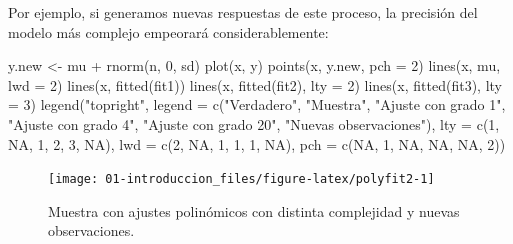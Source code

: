 \documentclass[
]{book}
\newenvironment{Shaded}{\begin{snugshade}}{\end{snugshade}}
\newcommand{\AttributeTok}[1]{\textcolor[rgb]{0.77,0.63,0.00}{#1}}
\newcommand{\ConstantTok}[1]{\textcolor[rgb]{0.00,0.00,0.00}{#1}}
\newcommand{\DecValTok}[1]{\textcolor[rgb]{0.00,0.00,0.81}{#1}}
\newcommand{\FunctionTok}[1]{\textcolor[rgb]{0.00,0.00,0.00}{#1}}
\newcommand{\NormalTok}[1]{#1}
\newcommand{\OtherTok}[1]{\textcolor[rgb]{0.56,0.35,0.01}{#1}}
\newcommand{\SpecialCharTok}[1]{\textcolor[rgb]{0.00,0.00,0.00}{#1}}
\newcommand{\StringTok}[1]{\textcolor[rgb]{0.31,0.60,0.02}{#1}}
\theoremstyle{break}
\theoremstyle{definition}
\theoremstyle{definition}
\theoremstyle{definition}
\theoremstyle{definition}
\theoremstyle{remark}
\begin{document}
Por ejemplo, si generamos nuevas respuestas de este proceso, la precisión del modelo más complejo empeorará considerablemente:

\begin{Shaded}
\begin{Highlighting}[]
\NormalTok{y.new }\OtherTok{\textless{}{-}}\NormalTok{ mu }\SpecialCharTok{+} \FunctionTok{rnorm}\NormalTok{(n, }\DecValTok{0}\NormalTok{, sd)}
\FunctionTok{plot}\NormalTok{(x, y) }
\FunctionTok{points}\NormalTok{(x, y.new, }\AttributeTok{pch =} \DecValTok{2}\NormalTok{)}
\FunctionTok{lines}\NormalTok{(x, mu, }\AttributeTok{lwd =} \DecValTok{2}\NormalTok{)}
\FunctionTok{lines}\NormalTok{(x, }\FunctionTok{fitted}\NormalTok{(fit1))}
\FunctionTok{lines}\NormalTok{(x, }\FunctionTok{fitted}\NormalTok{(fit2), }\AttributeTok{lty =} \DecValTok{2}\NormalTok{)}
\FunctionTok{lines}\NormalTok{(x, }\FunctionTok{fitted}\NormalTok{(fit3), }\AttributeTok{lty =} \DecValTok{3}\NormalTok{)}
\FunctionTok{legend}\NormalTok{(}\StringTok{"topright"}\NormalTok{, }\AttributeTok{legend =} \FunctionTok{c}\NormalTok{(}\StringTok{"Verdadero"}\NormalTok{, }\StringTok{"Muestra"}\NormalTok{, }\StringTok{"Ajuste con grado 1"}\NormalTok{, }\StringTok{"Ajuste con grado 4"}\NormalTok{, }
                              \StringTok{"Ajuste con grado 20"}\NormalTok{, }\StringTok{"Nuevas observaciones"}\NormalTok{), }
       \AttributeTok{lty =} \FunctionTok{c}\NormalTok{(}\DecValTok{1}\NormalTok{, }\ConstantTok{NA}\NormalTok{, }\DecValTok{1}\NormalTok{, }\DecValTok{2}\NormalTok{, }\DecValTok{3}\NormalTok{, }\ConstantTok{NA}\NormalTok{), }\AttributeTok{lwd =} \FunctionTok{c}\NormalTok{(}\DecValTok{2}\NormalTok{, }\ConstantTok{NA}\NormalTok{, }\DecValTok{1}\NormalTok{, }\DecValTok{1}\NormalTok{, }\DecValTok{1}\NormalTok{, }\ConstantTok{NA}\NormalTok{), }\AttributeTok{pch =} \FunctionTok{c}\NormalTok{(}\ConstantTok{NA}\NormalTok{, }\DecValTok{1}\NormalTok{, }\ConstantTok{NA}\NormalTok{, }\ConstantTok{NA}\NormalTok{, }\ConstantTok{NA}\NormalTok{, }\DecValTok{2}\NormalTok{))}
\end{Highlighting}
\end{Shaded}

\begin{figure}[!htb]

{\centering \texttt{[image: 01-introduccion\_files/figure-latex/polyfit2-1]} 

}

\caption{Muestra con ajustes polinómicos con distinta complejidad y nuevas observaciones.}\label{fig:polyfit2}
\end{figure}
\end{document}
